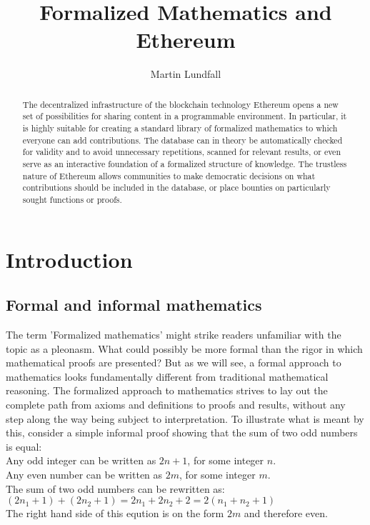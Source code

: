 \documentclass[11pt,a4paper]{article}
\title{Formalized Mathematics and Ethereum}
\author{Martin Lundfall}
\begin{document}

\maketitle

\begin{abstract}
The decentralized infrastructure of the blockchain technology Ethereum opens a new set of possibilities for sharing content in a programmable environment. In particular, it is highly suitable for creating a standard library of formalized mathematics to which everyone can add contributions. The database can in theory be automatically checked for validity and to avoid unnecessary repetitions, scanned for relevant results, or even serve as an interactive foundation of a formalized structure of knowledge. The trustless nature of Ethereum allows communities to make democratic decisions on what contributions should be included in the database, or place bounties on particularly sought functions or proofs.
\end{abstract}
\clearpage
\tableofcontents{}
\clearpage
\section{Introduction}\label{sec: Introduction}
\subsection{Formal and informal mathematics}\label{subsec: formal & informal}
The term 'Formalized mathematics' might strike readers unfamiliar with the topic as a pleonasm. What could possibly be more formal than the rigor in which mathematical proofs are presented? But as we will see, a formal approach to mathematics looks fundamentally different from traditional mathematical reasoning. The formalized approach to mathematics strives to lay out the complete path from axioms and definitions to proofs and results, without any step along the way being subject to interpretation. To illustrate what is meant by this, consider a simple informal proof showing that the sum of two odd numbers is equal:\\

Any odd integer can be written as $2n+1$, for some integer $n$.\\
Any even number can be written as $2m$, for some integer $m$.\\
The sum of two odd numbers can be rewritten as:\\
$(2n_1+1) + (2n_2+1) = 2n_1 + 2n_2 + 2 = 2(n_1 + n_2 + 1)$\\
The right hand side of this eqution is on the form $2m$ and therefore even.\\
\end{document}
